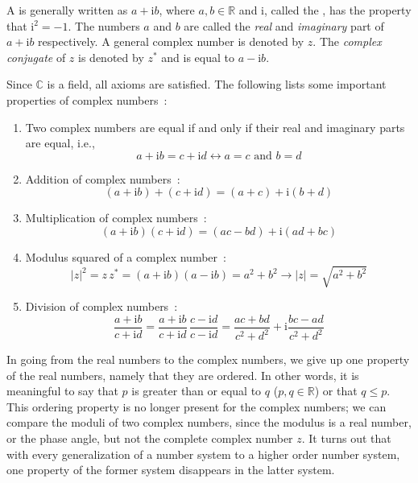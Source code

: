 A  is generally written as $a+\mathrm{i}b$, where $a, b\in\mathbb{R}$ and $\mathrm{i}$, called the ,
has the property that $\mathrm{i}^2=-1$.  The numbers $a$ and $b$ are called the \textit{real} and \textit{imaginary} part of $a+\mathrm{i}b$ respectively.
A general complex number is denoted by $z$.  The \textit{complex conjugate} of $z$ is denoted by $z^{\ast}$ and is equal to $a-\mathrm{i}b$.

\noindent Since $\mathbb{C}$ is a field, all axioms are satisfied.  The following lists some important properties of complex numbers~:
\begin{enumerate}
\item Two complex numbers are equal if and only if their real and imaginary parts are equal, i.e.,
\begin{equation}
a+\mathrm{i}b=c+\mathrm{i}d \leftrightarrow a=c\text{ and }b=d
\end{equation}

\item Addition of complex numbers~:
\begin{equation}
(a+\mathrm{i}b)+(c+\mathrm{i}d)=(a+c)+\mathrm{i}(b+d)
\end{equation}

\item Multiplication of complex numbers~:
\begin{equation}
(a+\mathrm{i}b)(c+\mathrm{i}d)=(ac-bd)+\mathrm{i}(ad+bc)
\end{equation}

\item Modulus squared of a complex number~:
\begin{equation}
\vert z\vert^2=z\,z^{\ast}=(a+\mathrm{i}b)(a-\mathrm{i}b)=a^2+b^2\rightarrow \vert z\vert = \sqrt{a^2+b^2}
\end{equation}

\item Division of complex numbers~:
\begin{equation}
\frac{a+\mathrm{i}b}{c+\mathrm{i}d}=\frac{a+\mathrm{i}b}{c+\mathrm{i}d}\,\frac{c-\mathrm{i}d}{c-\mathrm{i}d}=
\frac{ac+bd}{c^2+d^2}+\mathrm{i}\frac{bc-ad}{c^2+d^2}
\end{equation}
\end{enumerate}

In going from the real numbers to the complex numbers, we give up one property of the real numbers, namely that they are ordered.  In other words, it is meaningful to say that $p$ is greater than or equal to $q$ ($p,q\in\mathbb{R}$) or that $q\le p$. This ordering  property is no longer present for the complex numbers; we can compare the moduli of two complex numbers, since the modulus is a real number, or the phase angle, but  not the complete complex number $z$. It turns out that with every generalization of a number system to a higher order number system, one property of the former system disappears in the latter system.



